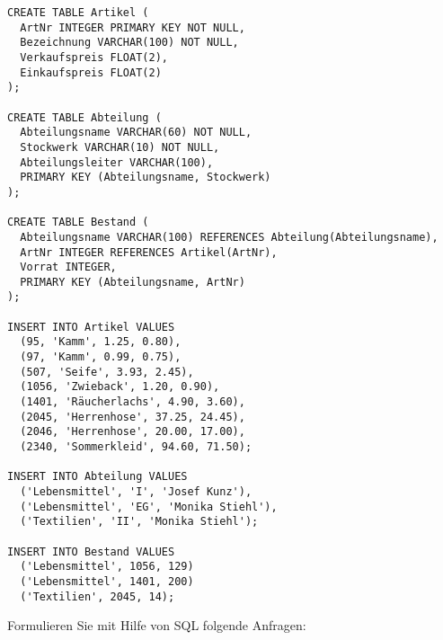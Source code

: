 \documentclass{bschlangaul-aufgabe}
\begin{document}
\begin{verbatim}
CREATE TABLE Artikel (
  ArtNr INTEGER PRIMARY KEY NOT NULL,
  Bezeichnung VARCHAR(100) NOT NULL,
  Verkaufspreis FLOAT(2),
  Einkaufspreis FLOAT(2)
);

CREATE TABLE Abteilung (
  Abteilungsname VARCHAR(60) NOT NULL,
  Stockwerk VARCHAR(10) NOT NULL,
  Abteilungsleiter VARCHAR(100),
  PRIMARY KEY (Abteilungsname, Stockwerk)
);

CREATE TABLE Bestand (
  Abteilungsname VARCHAR(100) REFERENCES Abteilung(Abteilungsname),
  ArtNr INTEGER REFERENCES Artikel(ArtNr),
  Vorrat INTEGER,
  PRIMARY KEY (Abteilungsname, ArtNr)
);

INSERT INTO Artikel VALUES
  (95, 'Kamm', 1.25, 0.80),
  (97, 'Kamm', 0.99, 0.75),
  (507, 'Seife', 3.93, 2.45),
  (1056, 'Zwieback', 1.20, 0.90),
  (1401, 'Räucherlachs', 4.90, 3.60),
  (2045, 'Herrenhose', 37.25, 24.45),
  (2046, 'Herrenhose', 20.00, 17.00),
  (2340, 'Sommerkleid', 94.60, 71.50);

INSERT INTO Abteilung VALUES
  ('Lebensmittel', 'I', 'Josef Kunz'),
  ('Lebensmittel', 'EG', 'Monika Stiehl'),
  ('Textilien', 'II', 'Monika Stiehl');

INSERT INTO Bestand VALUES
  ('Lebensmittel', 1056, 129)
  ('Lebensmittel', 1401, 200)
  ('Textilien', 2045, 14);
\end{verbatim}

Formulieren Sie mit Hilfe von SQL folgende Anfragen:
\end{document}
